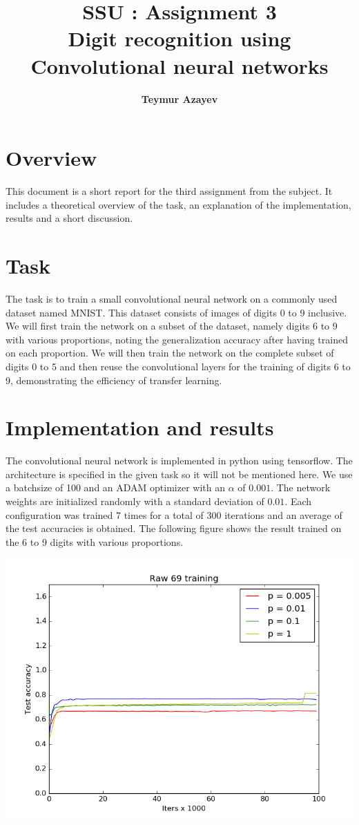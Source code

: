 \documentclass[11pt]{article}
\title{\textbf{SSU : Assignment 3} \\ \textbf{Digit recognition using Convolutional neural networks}}
\author{\textbf{Teymur Azayev}}
\date{}
\begin{document}
\maketitle

\section{Overview}
This document is a short report for the third assignment from the subject. It includes a theoretical overview of the task, an explanation of the implementation, results and a short discussion.

\section{Task}
The task is to train a small convolutional neural network on a commonly used dataset named MNIST.
This dataset consists of images of digits 0 to 9 inclusive.
We will first train the network on a subset of the dataset, namely digits 6 to 9 with various proportions,
noting the generalization accuracy after having trained on each proportion.
We will then train the network on the complete subset of digits 0 to 5 and then reuse the convolutional
layers for the training of digits 6 to 9, demonstrating the efficiency of transfer learning.

\section{Implementation and results} 
The convolutional neural network is implemented in python using tensorflow. The architecture is specified in the 
given task so it will not be mentioned here. We use a batchsize of 100 and an ADAM optimizer with an $\alpha$ of $0.001$. The network weights are initialized randomly with a standard deviation of $0.01$. Each configuration was trained 7 times for a total of 300 iterations and an average of the test accuracies is obtained. The following figure shows the result trained on the 6 to 9 digits with various proportions.


\includegraphics[width=\textwidth]{Raw69training}
\end{document}
